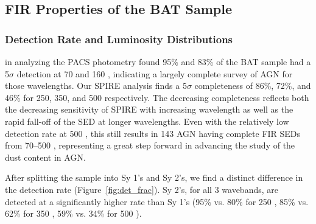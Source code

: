\subsection{FIR Properties of the BAT Sample }
\subsubsection{Detection Rate and Luminosity Distributions}\label{sec:det_rate_lum_dist}
\citet{Melendez:2014yu} in analyzing the PACS photometry found 95\% and 83\% of the BAT sample had a 5$\sigma$ detection at 70 and 160 \um, indicating a largely complete survey of AGN for those wavelengths. Our SPIRE analysis finds a 5$\sigma$ completeness of 86\%, 72\%, and 46\% for 250, 350, and 500 \um{} respectively. The decreasing completeness reflects both the decreasing sensitivity of SPIRE with increasing wavelength as well as the rapid fall-off of the SED at longer wavelengths. Even with the relatively low detection rate at 500 \um, this still results in 143 AGN having complete FIR SEDs from 70--500 \um, representing a great step forward in advancing the study of the dust content in AGN. 

After splitting the sample into Sy 1's and Sy 2's, we find a distinct difference in the detection rate (Figure~\ref{fig:det_frac}). Sy 2's, for all 3 wavebands, are detected at a significantly higher rate than Sy 1's (95\% vs. 80\% for 250 \um, 85\% vs. 62\% for 350 \um, 59\% vs. 34\% for 500 \um).
  
  
  
  